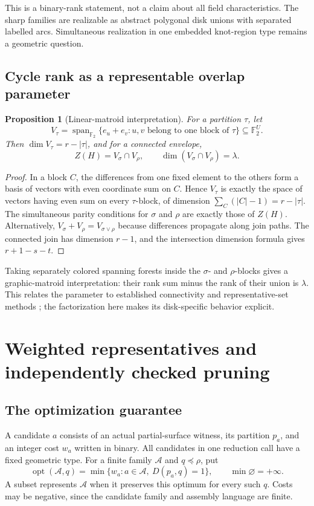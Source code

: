 \documentclass[11pt,a4paper]{article}
\newtheorem{proposition}[theorem]{Proposition}
\theoremstyle{definition}
\theoremstyle{remark}
\newcommand{\F}{\mathbb F_2}
\newcommand{\opt}{\operatorname{opt}}
\newcommand{\Span}{\operatorname{span}}
\begin{document}
This is a binary-rank statement, not a claim about all field characteristics. The sharp
families are realizable as abstract polygonal disk unions with separated labelled arcs.
Simultaneous realization in one embedded knot-region type remains a geometric question.

\subsection{Cycle rank as a representable overlap parameter}
\begin{proposition}[Linear-matroid interpretation]\label{prop:overlap}
For a partition $\tau$, let
\[
 V_\tau=\Span_{\F}\{e_u+e_v:u,v\text{ belong to one block of }\tau\}\subseteq\F^U.
\]
Then $\dim V_\tau=r-|\tau|$, and for a connected envelope,
\begin{equation}
                 Z(H)=V_\sigma\cap V_\rho,\qquad
                 \dim(V_\sigma\cap V_\rho)=\lambda.
 \label{eq:overlap}
\end{equation}
\end{proposition}
\begin{proof}
In a block $C$, the differences from one fixed element to the others form a basis of
vectors with even coordinate sum on $C$. Hence $V_\tau$ is exactly the space of vectors
having even sum on every $\tau$-block, of dimension $\sum_C(|C|-1)=r-|\tau|$.
The simultaneous parity conditions for $\sigma$ and $\rho$ are exactly those of
$Z(H)$. Alternatively, $V_\sigma+V_\rho=V_{\sigma\vee\rho}$ because differences
propagate along join paths. The connected join has dimension $r-1$, and the intersection
dimension formula gives $r+1-s-t$.
\end{proof}

Taking separately colored spanning forests inside the $\sigma$- and $\rho$-blocks gives
a graphic-matroid interpretation: their rank sum minus the rank of their union is
$\lambda$. This relates the parameter to established connectivity and representative-set
methods \cite{seymour,flps}; the factorization here makes its disk-specific behavior explicit.

\section{Weighted representatives and independently checked pruning}\label{sec:weighted}
\subsection{The optimization guarantee}
A candidate $a$ consists of an actual partial-surface witness, its partition $p_a$, and an
integer cost $w_a$ written in binary. All candidates in one reduction call have a fixed
geometric type. For a finite family $\mathcal A$ and $q\preceq\rho$, put
\[
 \opt(\mathcal A,q)=\min\{w_a:a\in\mathcal A,\ D(p_a,q)=1\},
 \qquad \min\varnothing=+\infty.
\]
A subset represents $\mathcal A$ when it preserves this optimum for every such $q$.
Costs may be negative, since the candidate family and assembly language are finite.
\end{document}

